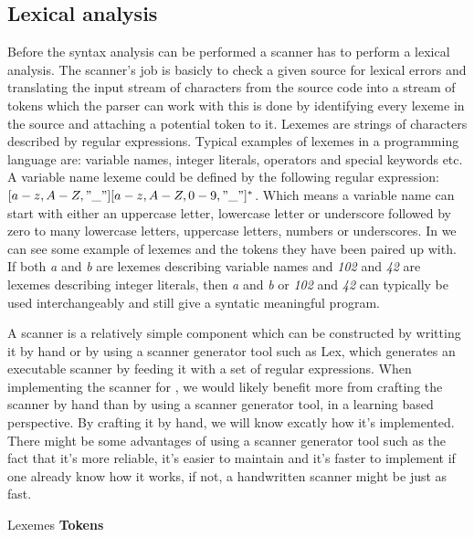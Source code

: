 \subsection{Lexical analysis}
\label{sec:lexicalanalysis}
Before the syntax analysis can be performed a scanner has to perform a lexical analysis. The scanner's job is basicly to check a given source for lexical errors and translating the input stream of characters from the source code into a stream of tokens which the parser can work with \cite[p. 57]{fischer2009} this is done by identifying every lexeme in the source and attaching a potential token to it. Lexemes are strings of characters described by regular expressions. Typical examples of lexemes in a programming language are: variable names, integer literals, operators and special keywords etc. A variable name lexeme could be defined by the following regular expression: $[a-z, A-Z, "\_"][a-z, A-Z, 0-9, "\_"]^*$. Which means a variable name can start with either an uppercase letter, lowercase letter or underscore followed by zero to many lowercase letters, uppercase letters, numbers or underscores. In  we can see some example of lexemes and the tokens they have been paired up with. If both \textit{a} and \textit{b} are lexemes describing variable names and \textit{102} and \textit{42} are lexemes describing integer literals, then \textit{a} and \textit{b} or \textit{102} and \textit{42} can typically be used interchangeably and still give a syntatic meaningful program. 

A scanner is a relatively simple component which can be constructed by writting it by hand or by using a scanner generator tool such as Lex, which generates an executable scanner by feeding it with a set of regular expressions. When implementing the scanner for \productname{}, we would likely benefit more from crafting the scanner by hand than by using a scanner generator tool, in a learning based perspective. By crafting it by hand, we will know excatly how it's implemented. There might be some advantages of using a scanner generator tool such as the fact that it's more reliable, it's easier to maintain and it's faster to implement if one already know how it works, if not, a handwritten scanner might be just as fast. 

		    {               }
{Lexemes   }{\textbf{Tokens}} {
}